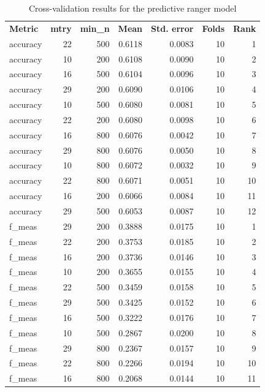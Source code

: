 \documentclass[
  11pt,
  a4paper,
]{article}
\begin{document}
\begin{longtable}[t]{>{\raggedleft\arraybackslash}p{2.4cm}rrrrrr}

\caption{\label{tbl-appendix-ranger-cross-validation}Cross-validation
results for the predictive ranger model}

\tabularnewline

\\
\toprule
\textbf{Metric} & \textbf{mtry} & \textbf{min\_n} & \textbf{Mean} & \textbf{Std. error} & \textbf{Folds} & \textbf{Rank}\\
\midrule
accuracy & 22 & 500 & 0.6118 & 0.0083 & 10 & 1\\
accuracy & 10 & 200 & 0.6108 & 0.0090 & 10 & 2\\
accuracy & 16 & 500 & 0.6104 & 0.0096 & 10 & 3\\
accuracy & 29 & 200 & 0.6090 & 0.0106 & 10 & 4\\
accuracy & 10 & 500 & 0.6080 & 0.0081 & 10 & 5\\
\addlinespace
accuracy & 22 & 200 & 0.6080 & 0.0098 & 10 & 6\\
accuracy & 16 & 800 & 0.6076 & 0.0042 & 10 & 7\\
accuracy & 29 & 800 & 0.6076 & 0.0050 & 10 & 8\\
accuracy & 10 & 800 & 0.6072 & 0.0032 & 10 & 9\\
accuracy & 22 & 800 & 0.6071 & 0.0051 & 10 & 10\\
\addlinespace
accuracy & 16 & 200 & 0.6066 & 0.0084 & 10 & 11\\
accuracy & 29 & 500 & 0.6053 & 0.0087 & 10 & 12\\
f\_meas & 29 & 200 & 0.3888 & 0.0175 & 10 & 1\\
f\_meas & 22 & 200 & 0.3753 & 0.0185 & 10 & 2\\
f\_meas & 16 & 200 & 0.3736 & 0.0146 & 10 & 3\\
\addlinespace
f\_meas & 10 & 200 & 0.3655 & 0.0155 & 10 & 4\\
f\_meas & 22 & 500 & 0.3459 & 0.0158 & 10 & 5\\
f\_meas & 29 & 500 & 0.3425 & 0.0152 & 10 & 6\\
f\_meas & 16 & 500 & 0.3222 & 0.0176 & 10 & 7\\
f\_meas & 10 & 500 & 0.2867 & 0.0200 & 10 & 8\\
\addlinespace
f\_meas & 29 & 800 & 0.2367 & 0.0157 & 10 & 9\\
f\_meas & 22 & 800 & 0.2266 & 0.0194 & 10 & 10\\
f\_meas & 16 & 800 & 0.2068 & 0.0144 & 10 & 11\\

\end{longtable}
\end{document}
